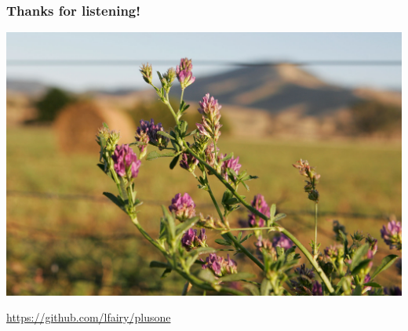 \documentclass{beamer}
\begin{document}
\begin{frame}
    \frametitle{Thanks for listening!}
    \begin{center}
        \includegraphics[height=0.5\paperwidth]{Lucerne_flowers.jpg}

        \url{https://github.com/lfairy/plusone}
    \end{center}
\end{frame}
\end{document}
